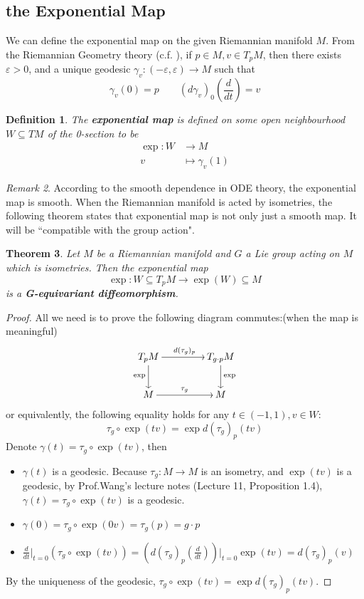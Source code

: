 \documentclass[reqno,11pt]{amsart}
\numberwithin{equation}{section}
\theoremstyle{plain}
\newtheorem{theorem}{Theorem}[section]
\newtheorem{defn}[theorem]{Definition}
\theoremstyle{plain}
\numberwithin{equation}{section}
\theoremstyle{remark}
\newtheorem{remark}[theorem]{Remark}
\begin{document}
\subsection{the Exponential Map}
We can define the exponential map on the given Riemannian manifold $M$. From the Riemannian Geometry theory (c.f. \cite{ZW2}), if $p \in M, v\in T_pM$, then there exists $\varepsilon>0$, and a unique geodesic $\gamma_v:(-\varepsilon, \varepsilon) \rightarrow M$ such that 
$$\gamma_v(0)=p \qquad (d\gamma_v)_0(\frac{d}{dt})=v$$
\begin{defn}
	The \textbf{exponential map} is defined on some open neighbourhood $W \subseteq TM$ of the 0-section to be
	\begin{equation*}
	\begin{aligned}
	\exp:W &\longrightarrow M\\
	v\; &\mapsto \gamma_v(1)
	\end{aligned}
	\end{equation*}
\end{defn}
\begin{remark}
	According to the smooth dependence in ODE theory, the exponential map is smooth. When the Riemannian manifold is acted by isometries, the following theorem states that exponential map is not only just a smooth map. It will be ``compatible with the group action".
\end{remark}
\begin{theorem}
	\label{thm:equi}
	Let $M$ be a Riemannian manifold and $G$ a Lie group acting on $M$ which is isometries. Then the exponential map
	$$\exp :W\subseteq T_pM \longrightarrow \exp(W) \subseteq M$$
	is a \textbf{G-equivariant diffeomorphism}.
\end{theorem}
\begin{proof}
	All we need is to prove the following diagram commutes:(when the map is meaningful)
	\begin{equation*}
	\SelectTips{eu}{12}
	\xymatrix@C=1.5cm{
		T_pM\ar[r]^{d(\tau_g)_p}\ar[d]_{\exp} & T_{g \cdot p}M\ar[d]^{\exp} \\
		M\ar[r]^{\tau_g} & M
	}
	\end{equation*}
	or equivalently, the following equality holds for any $t \in (-1,1), v \in W$:
	$$\tau_g \circ \exp(tv)=\exp d(\tau_g)_p(tv)$$
	Denote $\gamma(t)= \tau_g \circ \exp(tv)$, then
	\begin{itemize}
		\item $\gamma(t)$ is a geodesic. Because $\tau_g:M \rightarrow M$ is an isometry, and $\exp(tv)$ is a geodesic, by Prof.Wang's lecture notes \cite{ZW2} (Lecture 11, Proposition 1.4), $\gamma(t)= \tau_g \circ \exp(tv)$ is a geodesic.
		\item $\gamma(0)=\tau_g \circ \exp(0v)=\tau_g(p)=g \cdot p$
		\item $\displaystyle\frac{d}{dt}\bigg|_{t=0}(\tau_g\circ \exp(tv))=\left(d(\tau_g)_p\left(\frac{d}{dt}\right)\right)\bigg|_{t=0}\exp(tv)=d(\tau_g)_p(v)$
	\end{itemize}
By the uniqueness of the geodesic, $\tau_g \circ \exp(tv)=\exp d(\tau_g)_p(tv)$.
\end{proof}
\end{document}
